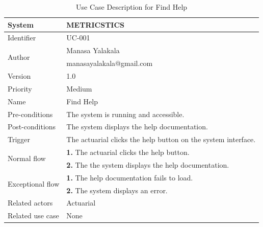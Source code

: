 \begin{table}[htb]
    \centering
    \begin{tabular}{|p{4cm}|p{12cm}|} \hline 
         System &  METRICSTICS\\ \hline 
         
         Identifier & UC-001 \\ \hline 
         
         \multirow{2}{*}{Author} & Manasa Yalakala  \\
         &manasayalakala@gmail.com \\
           \hline 
           Version & 1.0\\ \hline
         
         Priority &  Medium\\ \hline 
         
         Name & Find Help \\ \hline 
         Pre-conditions & The system is running and accessible. \\ \hline 
         Post-conditions &  The system displays the help documentation. \\ \hline
         Trigger & The actuarial clicks the help button on the system interface. \\ \hline
        \multirow{2}{*}{Normal flow} 
        & \textbf{1.} The actuarial clicks the help button. \\ 
        & \textbf{2.} The the system displays the help documentation. \\  
        
        \hline
         \multirow{2}{*}{Exceptional flow} 
        & \textbf{1.} The help documentation fails to load. \\ 
        & \textbf{2.} The system displays an error. \\ 
        \hline
         Related actors & Actuarial  \\ \hline
        Related use case & None \\ \hline
         
    \end{tabular}
    \caption{Use Case Description for Find Help}
    \label{tab:my_label}
\end{table}
